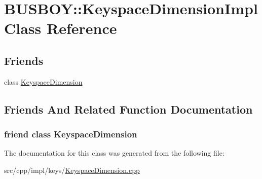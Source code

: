 \hypertarget{classBUSBOY_1_1KeyspaceDimensionImpl}{
\section{BUSBOY::KeyspaceDimensionImpl Class Reference}
\label{classBUSBOY_1_1KeyspaceDimensionImpl}
}
\subsection*{Friends}
\begin{DoxyCompactItemize}
\item 
class \hyperlink{classBUSBOY_1_1KeyspaceDimensionImpl_a5edf66ea5fa553c6f137ccc6bd9c031b}{KeyspaceDimension}
\end{DoxyCompactItemize}


\subsection{Friends And Related Function Documentation}
\hypertarget{classBUSBOY_1_1KeyspaceDimensionImpl_a5edf66ea5fa553c6f137ccc6bd9c031b}{
\subsubsection[{KeyspaceDimension}]{\setlength{\rightskip}{0pt plus 5cm}friend class {\bf KeyspaceDimension}}}
\label{classBUSBOY_1_1KeyspaceDimensionImpl_a5edf66ea5fa553c6f137ccc6bd9c031b}


The documentation for this class was generated from the following file:\begin{DoxyCompactItemize}
\item 
src/cpp/impl/keys/\hyperlink{KeyspaceDimension_8cpp}{KeyspaceDimension.cpp}\end{DoxyCompactItemize}
